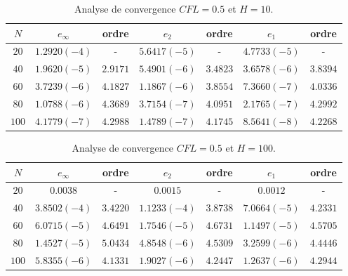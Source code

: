 \begin{table}[h]
\begin{center}
\begin{tabular}{c|c|c|c|c|c|c}
$N$ & $e_{\infty}$ & ordre & $e_2$ & ordre & $e_1$ & ordre \\ 
\hline 
\hline
$20$ & $1.2920 (-4)$ & - & $5.6417 (-5)$ & - & $4.7733 (-5)$ & - \\ 
\hline 
$40$ & $1.9620 (-5)$ & $2.9171$ & $5.4901 (-6)$ & $3.4823$ & $3.6578 (-6)$ & $3.8394$ \\ 
\hline 
$60$ & $3.7239 (-6)$ & $4.1827$ & $1.1867 (-6)$ & $3.8554$ & $7.3660 (-7)$ & $4.0336$ \\
\hline 
$80$ & $1.0788 (-6)$ & $4.3689$ & $3.7154 (-7)$ & $4.0951$ & $2.1765 (-7)$ & $4.2992$ \\ 
\hline 
$100$ & $4.1779(-7)$ & $4.2988$ & $1.4789 (-7)$ & $4.1745$ & $8.5641 (-8)$ & $4.2268$  \\ 
\end{tabular} 
\caption{Analyse de convergence $CFL=0.5$ et $H=10$.}
\label{CV_order4_hp10}
\end{center}
\end{table}

\begin{table}[h]
\begin{center}
\begin{tabular}{c|c|c|c|c|c|c}
$N$ & $e_{\infty}$ & ordre & $e_2$ & ordre & $e_1$ & ordre \\ 
\hline 
\hline
$20$ & $0.0038$ & - & $0.0015$ & - & $0.0012$ & - \\ 
\hline 
$40$ & $3.8502 (-4)$ & $3.4220$ & $1.1233 (-4)$ & $3.8738$ & $7.0664 (-5)$ & $4.2331$ \\ 
\hline 
$60$ & $6.0715 (-5)$ & $4.6491$ & $1.7546 (-5)$ & $4.6731$ & $1.1497 (-5)$ & $4.5705$ \\
\hline 
$80$ & $1.4527 (-5)$ & $5.0434$ & $4.8548 (-6)$ & $4.5309$ & $3.2599 (-6)$ & $4.4446$ \\ 
\hline 
$100$ & $5.8355(-6)$ & $4.1331$ & $1.9027 (-6)$ & $4.2447$ & $1.2637 (-6)$ & $4.2944$  \\ 
\end{tabular} 
\caption{Analyse de convergence $CFL=0.5$ et $H=100$.}
\label{CV_order4_hp100}
\end{center}
\end{table}

